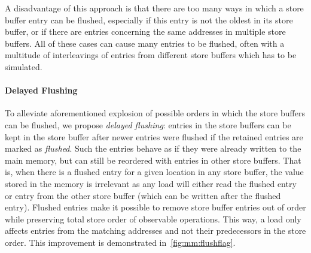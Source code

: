 A disadvantage of this approach is that there are too many ways in which a store
buffer entry can be flushed, especially if this entry is not the oldest in its
store buffer, or if there are entries concerning the same addresses in multiple store buffers.
All of these cases can cause many entries to be flushed, often with a multitude of interleavings of entries from different store buffers which has to be simulated.

\paragraph{Delayed Flushing} %
To alleviate aforementioned explosion of possible orders in which the store
buffers can be flushed, we propose \emph{delayed flushing}: entries in the
store buffers can be kept in the store buffer after newer entries were flushed
if the retained entries are marked as \emph{flushed}.
Such the entries behave as if they were already written to the main memory, but can still be reordered with entries in other store buffers.
That is, when there is a flushed entry for a given location in any store buffer, the value stored in the memory is irrelevant as any load will either read the flushed entry or entry from the other store buffer (which can be written after the flushed entry).
Flushed entries make it possible to remove store buffer entries out of order while preserving total store order of observable operations.
This way, a load only affects entries from the matching addresses and not their predecessors in the store order.
This improvement is demonstrated in~\autoref{fig:mm:flushflag}.


